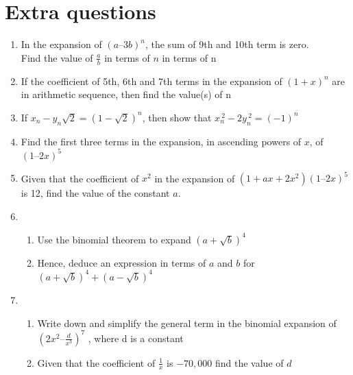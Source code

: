 \documentclass[12pt]{article}
\begin{document}
\section{Extra questions}
\begin{enumerate}
	\item In the expansion of $(a–3b)^n$, the sum of 9th and 10th term is zero. \\
	Find the value of  $\frac{a}{b}$ in terms of $n$ in terms of  n
	\item  If the coefficient of 5th, 6th and 7th terms in the expansion of  $(1+x)^n$ are in arithmetic sequence, then find the value(s) of n
	\item If $x_n - y_n\sqrt{2} = (1- \sqrt{2})^n$, then show that $x_n^{~2} - 2y_n^{~2} = (-1)^n$
	\item Find the first three terms in the expansion, in ascending powers of $x$, of $(1–2x)^5$
	\item Given that the coefficient of $x^2$ in the expansion of $(1+ax+2x^2)(1–2x)^5$ is 12, find the value of the constant $a$.
	\item ~
	\begin{enumerate}
		\item Use the binomial theorem to expand  $(a+\sqrt{b})^4$
		\item  Hence, deduce an expression in terms of  $a$ and  $b$ for $(a+\sqrt{b})^4 + (a-\sqrt{b})^4$
	\end{enumerate}
	\item ~
	\begin{enumerate}
		\item Write down and simplify the general term in the binomial expansion of $\displaystyle (2x^2– \frac{d}{x^3})^7$ , where  d is a constant
		\item Given that the coefficient of $\displaystyle \frac{1}{x}$ is $-70,000$ find the value of $d$
	\end{enumerate}
	
\end{enumerate}

\newpage
 
\newpage
\end{document}

